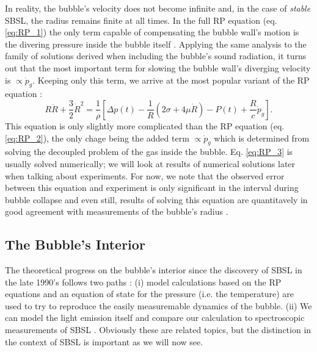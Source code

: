 \documentclass[rmp,aps,nofootinbib,superscriptaddress,floatfix]{revtex4-2}
\begin{document}
In reality, the bubble's velocity does not become infinite and, in the case of \emph{stable} SBSL, the radius remains finite at all times. In the full RP equation (eq. \ref{eq:RP_1}) the only term capable of compensating the bubble wall's motion is the divering pressure inside the bubble itself \cite{brenner2002single}. Applying the same analysis to the family of solutions derived when including the bubble's sound radiation, it turns out that the most important term for slowing the bubble wall's diverging velocity is $\propto\dot{p}_g$. Keeping only this term, we arrive at the most popular variant of the RP equation \cite{lofstedt1995sonoluminescing,barber1997defining}:
\begin{equation}
    R\ddot{R}+\frac{3}{2}\dot{R}^2 = \frac{1}{\rho} \left[ \Delta p(t)-\frac{1}{R}\left( 2\sigma+4\mu \dot{R} \right)-P(t) +\frac{R}{c} \dot{p}_g \right].
    \label{eq:RP_3}
\end{equation}
This equation is only slightly more complicated than the RP equation (eq. \ref{eq:RP_2}), the only chage being the added term $\propto \dot{p}_g$ which is determined from solving the decoupled problem of the gas inside the bubble. Eq. \ref{eq:RP_3} is usually solved numerically; we will look at results of numerical solutions later when talking about experiments. For now, we note that the observed error between this equation and experiment is only significant in the interval during bubble collapse and even still, results of solving this equation are quantitavely in good agreement with measurements of the bubble's radius \cite{brenner2002single}. 


\subsection{The Bubble's Interior}

The theoretical progress on the bubble's interior since the discovery of SBSL in the late 1990's \cite{gaitan1992sonoluminescence} follows two paths \cite{brenner2002single,suslick2008inside,yasui2018acoustic}: (i) model calculations based on the RP equations and an equation of state for the pressure (i.e. the temperature) are used to try to reproduce the easily measuremable dynamics of the bubble. (ii) We can model the light emission itself and compare our calculation to spectroscopic measurements of SBSL \cite{}. Obviously these are related topics, but the distinction in the context of SBSL is important as we will now see.
\end{document}
